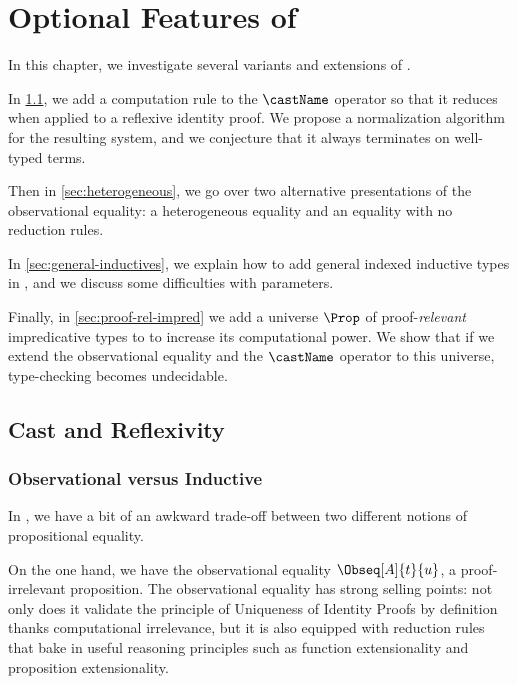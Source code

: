 \setchapterpreamble[u]{\margintoc}
\chapter{Optional Features of \SetoidCC}

In this chapter, we investigate several variants and extensions of \SetoidCC.

In \cref{sec:cast-refl}, we add a computation rule to the \( \castName \)
operator so that it reduces when applied to a reflexive identity proof. 
We propose a normalization algorithm for the resulting system, and we 
conjecture that it always terminates on well-typed terms.

Then in \cref{sec:heterogeneous}, we go over two alternative presentations of the 
observational equality: a heterogeneous equality and an equality with no
reduction rules.

In \cref{sec:general-inductives}, we explain how to add general indexed 
inductive types in \SetoidCC, and we discuss some difficulties with parameters.

Finally, in \cref{sec:proof-rel-impred} we add a universe \( \Prop \) of 
proof-\emph{relevant} impredicative types to \SetoidCC to increase
its computational power.
% 
We show that if we extend the observational equality and the \( \castName \)
operator to this universe, type-checking becomes undecidable.

\section{Cast and Reflexivity}
\label{sec:cast-refl}

\subsection{Observational versus Inductive}

In \SetoidCC, we have a bit of an awkward trade-off between two different 
notions of propositional equality.

On the one hand, we have the observational equality \( \Obseq[A]{t}{u} \),
a proof-irrelevant proposition.
% 
The observational equality has strong selling points: not only does it validate 
the principle of Uniqueness of Identity Proofs by definition thanks 
computational irrelevance, but it is also equipped with reduction rules that 
bake in useful reasoning principles such as function extensionality and proposition 
extensionality.

